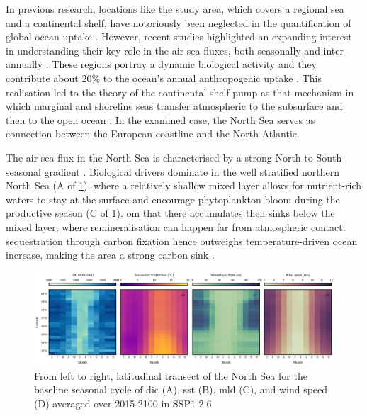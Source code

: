 In previous research, locations like the study area, which covers a regional sea and a continental shelf, have notoriously been neglected in the quantification of global ocean  uptake \citep{prowe2009mechanisms, borges2006carbon}. However, recent studies highlighted an expanding interest in understanding their key role in the air-sea  fluxes, both seasonally and inter-annually \citep{omar2010spatiotemporal}. These regions portray a dynamic biological activity and they contribute about 20\% to the ocean's annual anthropogenic  uptake \citep{thomas2004enhanced}. This realisation led to the theory of the continental shelf pump as that mechanism in which marginal and shoreline seas transfer atmospheric  to the subsurface and then to the open ocean \citep{salt2013variability, bozec2005continental, thomas2004enhanced}. In the examined case, the North Sea serves as connection between the European coastline and the North Atlantic. 

The air-sea  flux in the North Sea is characterised by a strong North-to-South seasonal gradient \citep{salt2013variability, prowe2009mechanisms}. Biological drivers dominate in the well stratified northern North Sea (A of \cref{dsmw}), where a relatively shallow mixed layer allows for nutrient-rich waters to stay at the surface and encourage phytoplankton bloom during the productive season (C of \cref{dsmw}). \ac{om} that there accumulates then sinks below the mixed layer, where remineralisation can happen far from atmospheric contact.  sequestration through carbon fixation hence outweighs temperature-driven ocean  increase, making the area a strong carbon sink \citep{prowe2009mechanisms}. 

\begin{figure}[H]
\caption[Latitudinal transect of the North Sea for the baseline seasonal cycle of \texorpdfstring{DIC}{DIC}, \texorpdfstring{SST}{SST}, \texorpdfstring{MLD}{MLD}, and wind speed averaged over 2015-2100 in SSP1-2.6.]{From left to right, latitudinal transect of the North Sea for the baseline seasonal cycle of \ac{dic} (A), \ac{sst} (B), \ac{mld} (C), and wind speed (D) averaged over 2015-2100 in SSP1-2.6.}
\label{dsmw}
\centering
\includegraphics[width=15cm]{fig/1_Introduction/dsmw.png}

\end{figure}

